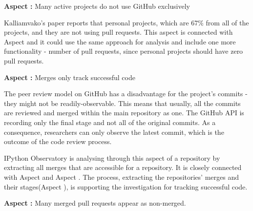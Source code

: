 \vspace{5mm}
\begin{mdframed}
\vspace{1px}
\textbf{Aspect :}  Many active projects do not use GitHub exclusively
\vspace{1px}
\end{mdframed}
\vspace{2mm}

Kalliamvako's paper\cite{kalliamvakoupromises} reports that personal projects, which are 67\% from all of the projects, and they are not using pull requests. This aspect is connected with Aspect  and it could use the same approach for analysis and include one more functionality - number of pull requests, since personal projects should have zero pull requests.

\vspace{5mm}
\begin{mdframed}
\vspace{1px}
\textbf{Aspect :}  Merges only track successful code
\vspace{1px}
\end{mdframed}
\vspace{2mm}

The peer review model on GitHub has a disadvantage for the project's commits - they might not be readily-observable. This means that usually, all the commits are reviewed and merged within the main repository as one. The GitHub API\cite{gitHubAPI} is recording only the final stage and not all of the original commits. As a consequence, researchers can only observe the latest commit, which is the outcome of the code review process\cite{kalliamvakoupromises}.

IPython Observatory is analysing through this aspect of a repository by extracting all merges that are accessible for a repository. It is closely connected with Aspect  and Aspect . The process, extracting the repositories' merges and their stages(Aspect ), is supporting the investigation for tracking successful code.  

\vspace{5mm}
\begin{mdframed}
\vspace{1px}
\textbf{Aspect :}  Many merged pull requests appear as non-merged.
\vspace{1px}
\end{mdframed}
\vspace{2mm}

